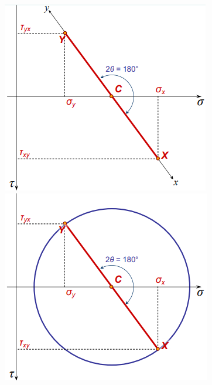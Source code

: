 \documentclass[class=report, crop=false, 12pt,a4paper]{standalone}
\begin{document}
\begin{figure}[H]
\begin{minipage}{0.25\textwidth}
        \includegraphics[width=\textwidth]{../img/diagram50.png}   
    \end{minipage}
    \begin{minipage}{0.23\textwidth}
        \centering
        \includegraphics[width=\textwidth]{../img/diagram51.png}   
    \end{minipage}
    \caption{}
\end{figure}
\end{document}
